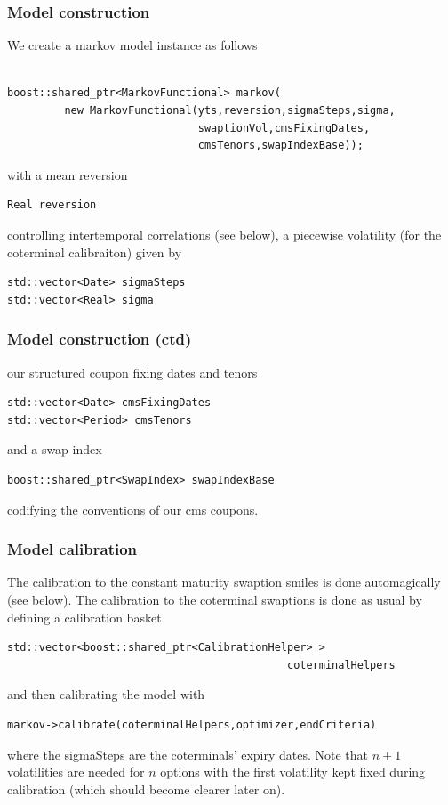 \documentclass{beamer}
\begin{document}
\begin{frame}[fragile]
\frametitle{Model construction}
We create a markov model instance as follows 
\begin{verbatim}

boost::shared_ptr<MarkovFunctional> markov(
         new MarkovFunctional(yts,reversion,sigmaSteps,sigma,
                              swaptionVol,cmsFixingDates,
                              cmsTenors,swapIndexBase));

\end{verbatim}
with a mean reversion
\begin{verbatim}
Real reversion
\end{verbatim}
 controlling intertemporal correlations (see below), a piecewise volatility (for the coterminal
calibraiton) given by
\begin{verbatim}
std::vector<Date> sigmaSteps
std::vector<Real> sigma
\end{verbatim}
\end{frame}

\begin{frame}[fragile]
\frametitle{Model construction (ctd)}
our structured coupon fixing dates and tenors
\begin{verbatim}
std::vector<Date> cmsFixingDates
std::vector<Period> cmsTenors
\end{verbatim}
and a swap index 
\begin{verbatim}
boost::shared_ptr<SwapIndex> swapIndexBase
\end{verbatim}
codifying the conventions of our cms coupons.
\end{frame}

\begin{frame}[fragile]
\frametitle{Model calibration}
The calibration to the constant maturity swaption smiles is done automagically (see below). The calibration to
the coterminal swaptions is done as usual by defining a calibration basket
\begin{verbatim}
std::vector<boost::shared_ptr<CalibrationHelper> > 
                                            coterminalHelpers
\end{verbatim}
and then calibrating the model with
\begin{verbatim}
markov->calibrate(coterminalHelpers,optimizer,endCriteria)
\end{verbatim}
where the sigmaSteps are the coterminals' expiry dates. Note that $n+1$ volatilities are needed for $n$
options with the first volatility kept fixed during calibration (which should become clearer later on).
\end{frame}
\end{document}
